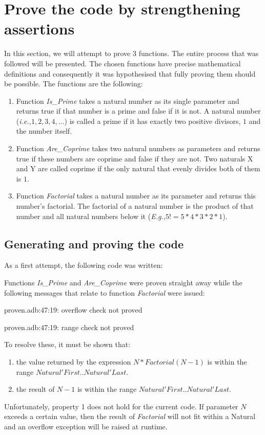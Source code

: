 \documentclass{llncs}
\newcommand{\ie}{\textit{i.e.,}\xspace}
\newcommand{\Eg}{\textit{E.g.,}\xspace}
\begin{document}
\section{Prove the code by strengthening assertions}
In this section, we will attempt to prove 3 functions. The entire process that
was followed will be presented. The chosen functions have precise mathematical
definitions and consequently it was hypothesised that fully proving them should
be possible. The functions are the following:
\begin{enumerate}
  \item Function \emph{Is\_Prime} takes a natural number as its single parameter and
    returns true if that number is a prime and false if it is not. A natural
    number (\ie $1, 2, 3, 4, \dots$) is called a prime if it has exactly two
    positive divisors, $1$ and the number itself.

  \item Function \emph{Are\_Coprime} takes two natural numbers as parameters and returns
    true if these numbers are coprime and false if they are not. Two naturals
    X and Y are called coprime if the only natural that evenly divides both of
    them is $1$.

  \item Function \emph{Factorial} takes a natural number as its parameter and returns
    this number's factorial. The factorial of a natural number is the product
    of that number and all natural numbers below it (\Eg $5! = 5 * 4 * 3 * 2 * 1$).
\end{enumerate}

\subsection{Generating and proving the code}
As a first attempt, the following code was written:


Functions \emph{Is\_Prime} and \emph{Are\_Coprime} were proven straight away while the following
messages that relate to function \emph{Factorial} were issued:

proven.adb:47:19: overflow check not proved

proven.adb:47:19: range check not proved

\noindent
To resolve these, it must be shown that:
\begin{enumerate}
  \item the value returned by the expression $N * Factorial (N - 1)$ is within
    the range $Natural'First .. Natural'Last$.

  \item the result of $N - 1$ is within the range
    $Natural'First .. Natural'Last$.
\end{enumerate}
Unfortunately, property 1 does not hold for the current code. If parameter
$N$ exceeds a certain value, then the result of \emph{Factorial} will not fit
within a Natural and an overflow exception will be raised at runtime.
\end{document}
